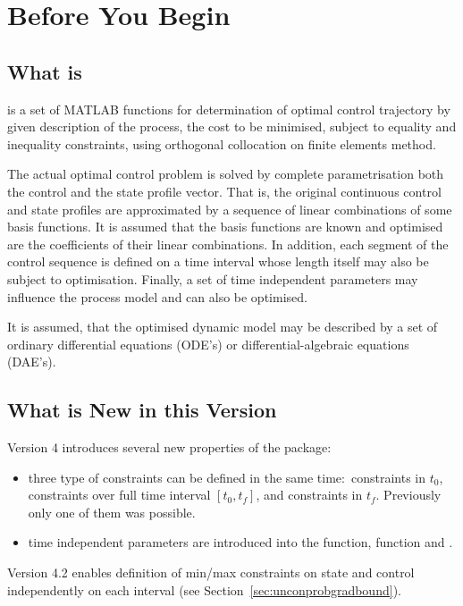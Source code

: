 \chapter{Before You Begin}
\label{cha:beforebegin}

\section{What is~}
\label{sec:whatisdynopt}

 is a set of MATLAB functions for determination of optimal
control trajectory by given description of the process, the cost to be
minimised, subject to equality and inequality constraints, using
orthogonal collocation on finite elements method. 

The actual optimal control problem is solved by complete
parametrisation both the control and the state profile vector. That
is, the original continuous control and state profiles are
approximated by a sequence of linear combinations of some basis
functions. It is assumed that the basis functions are known and
optimised are the coefficients of their linear combinations. In
addition, each segment of the control sequence is defined on a time
interval whose length itself may also be subject to
optimisation. Finally, a set of time independent parameters may
influence the process model and can also be optimised.

It is assumed, that the optimised dynamic model may be described by a
set of ordinary differential equations (ODE's) or
differential-algebraic equations (DAE's).

\section{What is New in this Version}
\label{sec:what-new-this}


Version 4 introduces several new properties of the package:
\begin{itemize}
\item three type of constraints can be defined in the same
  time:~constraints in $t_{0}$, constraints over full time interval 
  $[t_{0},t_{f}]$, and constraints in $t_{f}$. Previously only one of
  them was possible.
\item time independent parameters are introduced into the 
  function,  function and .
\end{itemize}
Version 4.2 enables definition of min/max constraints on state and
control independently on each interval (see
Section~\ref{sec:unconprobgradbound}).

